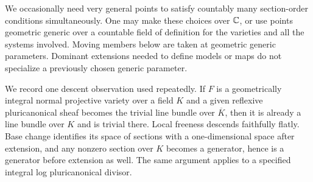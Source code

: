 We occasionally need very general points to satisfy countably many
section-order conditions simultaneously. One may make these choices
over $\mathbb C$, or use points geometric generic over a countable field of
definition for the varieties and all the systems involved. Moving
members below are taken at geometric generic parameters. Dominant
extensions needed to define models or maps do not specialize a
previously chosen generic parameter.

We record one descent observation used repeatedly. If $F$ is a
geometrically integral normal projective variety over a field $K$
and a given reflexive pluricanonical sheaf becomes the trivial line
bundle over $\overline K$, then it is already a line bundle over $K$
and is trivial there. Local freeness descends faithfully flatly.
Base change identifies its space of sections with a one-dimensional
space after extension, and any nonzero section over $K$ becomes a
generator, hence is a generator before extension as well. The same
argument applies to a specified integral log pluricanonical divisor.
